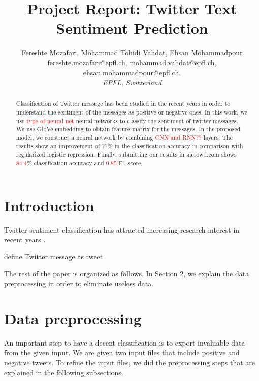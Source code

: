 \documentclass[8pt,conference,compsocconf]{IEEEtran}
\begin{document}
\title{Project Report: Twitter Text Sentiment Prediction}

\author{
 Fereshte Mozafari, Mohammad Tohidi Vahdat, Ehsan Mohammadpour\\
 fereshte.mozafari@epfl.ch, mohammad.vahdat@epfl.ch, ehsan.mohammadpour@epfl.ch, \\
  \textit{EPFL, Switzerland}
}

\maketitle

\begin{abstract}
	Classification of Twitter message has been studied in the recent years in order to understand the sentiment of the messages as positive or negative ones.
	In this work, we use \textcolor{red}{type of neural net} neural networks to classify the sentiment of twitter messages. We use GloVe embedding to obtain feature matrix for the messages. In the proposed model, we construct a neural network by combining \textcolor{red}{CNN and RNN??} layers. The results show an improvement of $??$\% in the classification accuracy in comparison with regularized logistic regression. Finally, submitting our results in aicrowd.com shows \textcolor{red}{$84.4$}\% classification accuracy and \textcolor{red}{$0.85$} F1-score.
\end{abstract}
\section{Introduction}
Twitter sentiment classification has attracted increasing research interest in recent years \cite{8700266,8924403}.

define Twitter message as tweet
\par 
The rest of the paper is organized as follows. In Section \ref{sec:data}, we explain the data preprocessing in order to eliminate useless data. 


\section{Data preprocessing}\label{sec:data}
An important step to have a decent classification is to export invaluable data from the given input. We are given two input files that include positive and negative tweets. To refine the input files, we did the preprocessing steps that are explained in the following subsections.
\end{document}
